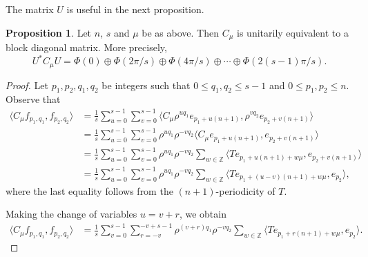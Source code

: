 \documentclass[12pt,reqno]{amsart}
\theoremstyle{definition}
\newtheorem{proposition}[theorem]{Proposition}
\begin{document}
The matrix $U$ is useful in the next proposition.

\begin{proposition}\label{prop:Cmu}
Let $n$, $s$ and $\mu$ be as above. Then $C_\mu$ is unitarily equivalent to a block diagonal matrix. More precisely,   
\[
  U^{*}C_{\mu} U=\Phi(0) \oplus \Phi(2\pi/s) \oplus \Phi(4\pi/s) \oplus \cdots \oplus \Phi(2(s-1)\pi/s).
  \]
\end{proposition}
\begin{proof}
Let $p_1, p_2, q_1, q_2$ be integers such that $0 \leq q_1, q_2 \leq s-1$ and $0\leq p_1, p_2 \leq n$. Observe that
\begin{align*}
   \langle C_{\mu} f_{p_1, q_1}, f_{p_2, q_2} \rangle 
   & =\frac{1}{s} \sum_{u=0}^{s-1} \sum_{v=0}^{s-1} \langle C_{\mu} \rho^{u q_1} e_{p_1+u (n+1)}, \rho^{v q_2} e_{p_2+v (n+1)} \rangle \\
   &=\frac{1}{s}\sum_{u=0}^{s-1} \sum_{v=0}^{s-1}  \rho^{u q_1} \rho^{-v q_2}\langle C_{\mu} e_{p_1+u (n+1)}, e_{p_2+v (n+1)} \rangle \\ 
   &=\frac{1}{s}\sum_{u=0}^{s-1} \sum_{v=0}^{s-1}  \rho^{u q_1} \rho^{-v q_2}  \sum_{w \in {\mathbb Z}}  \langle 
      T e_{p_1 +u (n+1) +w \mu}, e_{p_2 +v (n+1)} \rangle \\
&=\frac{1}{s}\sum_{u=0}^{s-1} \sum_{v=0}^{s-1} \rho^{u q_1} \rho^{-v q_2} \sum_{w \in {\mathbb Z}}  \langle
      T e_{p_1 +(u-v) (n+1) +w \mu}, e_{p_2} \rangle,   
\end{align*}
where the last equality follows from the $(n+1)$-periodicity of $T$.

Making the change of variables $u=v+r$, we obtain
\begin{align*}
   \langle C_{\mu} f_{p_1, q_1}, f_{p_2, q_2} \rangle 
   & =\frac{1}{s}\sum_{v=0}^{s-1} \sum_{r=-v}^{-v+s-1}  \rho^{(v+r)q_1} \rho^{-v q_2}  \sum_{w \in {\mathbb Z}}  \langle
      T e_{p_1 + r (n+1) +w \mu}, e_{p_2} \rangle.
    \end{align*}
    

\end{proof}
\end{document}
